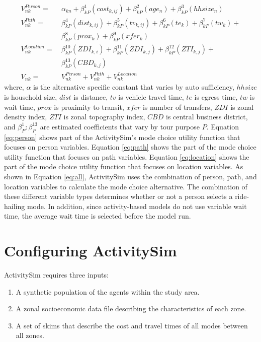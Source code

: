 \documentclass[simple, masters, twoside]{byuthesis}
\providecommand{\tightlist}{%
  \setlength{\itemsep}{0pt}\setlength{\parskip}{0pt}}
\begin{document}
\begin{align}
  V_{nk}^{Person} =& \ \alpha_{kn} + \beta_{kP}^1(cost_{k,ij}) + \beta_{kP}^2(age_{n}) 
   + \beta_{kP}^3(hhsize_{n}) \label{eq:person} \\
  V_{nk}^{Path} =& \ \beta_{kP}^4(dist_{k,ij}) +  \beta_{kP}^5(tv_{k,ij}) + 
       \beta_{kP}^6(te_{k}) +  \beta_{kP}^7(tw_{k}) + \nonumber \\ 
      & \ \beta_{kP}^8(prox_{k}) + \beta_{kP}^9(xfer_{k})  \label{eq:path} \\
  V_{nk}^{Location} =&  \ \beta_{kP}^{10}(ZDI_{k,i}) + \beta_{kP}^{11}(ZDI_{k,j}) + 
      \beta_{kP}^{12}(ZTI_{k,j}) + \nonumber \\ 
      & \ \beta_{kP}^{13}(CBD_{k,j}) \label{eq:location}\\
  V_{nk} =& \ V_{nk}^{Person} + V_{nk}^{Path} + V_{nk}^{Location} \label{eq:all}
\end{align}
where, \(\alpha\) is the alternative specific constant that varies by auto sufficiency, \(hhsize\) is household size, \(dist\) is distance, \(tv\) is vehicle travel time, \(te\) is egress time, \(tw\) is wait time, \(prox\) is proximity to transit, \(xfer\) is number of transfers, \(ZDI\) is zonal density index, \(ZTI\) is zonal topography index, \(CBD\) is central business district, and \(\beta_{P}^1:\beta_{P}^{13}\) are estimated coefficients that vary by tour purpose \(P\). Equation \eqref{eq:person} shows part of the ActivitySim's mode choice utility function that focuses on person variables. Equation \eqref{eq:path} shows the part of the mode choice utility function that focuses on path variables. Equation \eqref{eq:location} shows the part of the mode choice utility function that focuses on location variables. As shown in Equation \eqref{eq:all}, ActivitySim uses the combination of person, path, and location variables to calculate the mode choice alternative. The combination of these different variable types determines whether or not a person selects a ride-hailing mode. In addition, since activity-based models do not use variable wait time, the average wait time is selected before the model run.

\hypertarget{configuring-activitysim}{%
\section{Configuring ActivitySim}\label{configuring-activitysim}}

ActivitySim requires three inputs:

\begin{enumerate}
\def\labelenumi{\arabic{enumi}.}
\tightlist
\item
  A synthetic population of the agents within the study area.
\item
  A zonal socioeconomic data file describing the characteristics of each zone.
\item
  A set of skims that describe the cost and travel times of all modes between all zones.
\end{enumerate}
\end{document}

